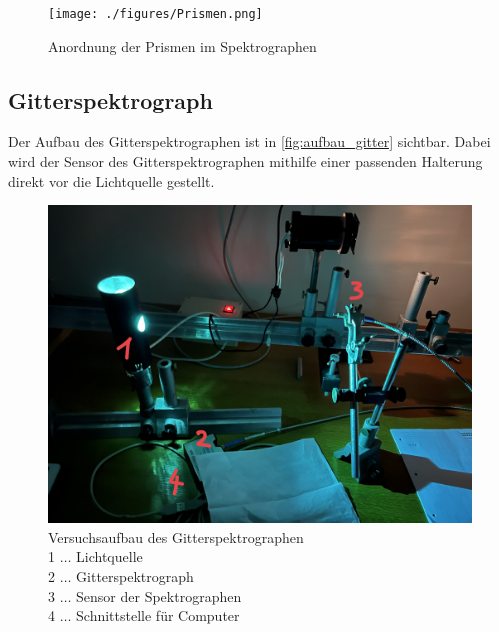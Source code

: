 \documentclass[12pt,english,ngerman]{scrartcl}
\begin{document}
\begin{figure}[H]
	\begin{center}
		\texttt{[image: ./figures/Prismen.png]}
	\end{center}
	\caption[Anordnung der Prismen im Spektrographen] {Anordnung der Prismen im
		Spektrographen
	}\label{fig:prismen}
\end{figure}

\subsection{Gitterspektrograph}

Der Aufbau des Gitterspektrographen ist in \autoref{fig:aufbau_gitter}
sichtbar. Dabei wird der Sensor des Gitterspektrographen mithilfe einer
passenden Halterung direkt vor die Lichtquelle gestellt.
\begin{figure}[H]
	\begin{center}
		\includegraphics[width =\textwidth]{./figures/Gitterspektograph_new.png}
	\end{center}
	\caption[Versuchsaufbau des Gitterspektrographen] {Versuchsaufbau des
		Gitterspektrographen                  \\
		1 \(\dots\) Lichtquelle               \\
		2 \(\dots\) Gitterspektrograph        \\
		3 \(\dots\) Sensor der Spektrographen \\
		4 \(\dots\) Schnittstelle für Computer
	}\label{fig:aufbau_gitter}
\end{figure}

\newpage
\end{document}
